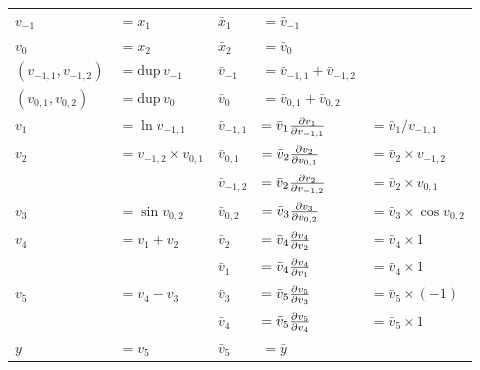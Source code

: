 \documentclass[12pt]{article}
\newcommand{\dup}{\mathrm{dup}}
\begin{document}
\begin{tabular}[t]{ll|lll}

  $v_{-1}$ & $= x_1$
  &
  $\bar{x}_1$ & $= \bar{v}_{-1}$
  \\
  
  $v_{0}$ & $= x_2$
  &
  $\bar{x}_2$ & $= \bar{v}_{0}$
  \\

  \hline

  \((v_{-1,1}, v_{-1,2})\) & \(= \dup \, v_{-1}\)
  &
  \(\bar{v}_{-1}\) & \(= \bar{v}_{-1,1} + \bar{v}_{-1,2}\)
  \\

  \((v_{0,1}, v_{0,2})\) & \(= \dup \, v_0\)
  &
  \(\bar{v}_{0}\) & \(= \bar{v}_{0,1} + \bar{v}_{0,2}\)
  \\

  $v_1$ & $= \ln{v_{-1,1}}$
  &
  \(\bar{v}_{-1,1}\)
  & \(
  = \bar{v}_{1} \frac{\partial v_{1}}{\partial v_{-1,1}}\)
  & \(
  = \bar{v}_1 / v_{-1,1}
  \) \\

  $v_2$ & $= v_{-1,2} \times v_{0,1}$
  &
  \(\bar{v}_{0,1}\)
  & \(
  = \bar{v}_{2} \frac{\partial v_{2}}{\partial v_{0,1}}\)
  & \(
  = \bar{v}_2 \times v_{-1,2}
  \) \\

  & &
  \(\bar{v}_{-1,2}\)
  &
  \(= \bar{v}_{2} \frac{\partial v_{2}}{\partial v_{-1,2}}\)
  & \(
  = \bar{v}_2 \times v_{0,1}
  \) \\

  $v_3$ & $= \sin{v_{0,2}}$
  &
  \(\bar{v}_{0,2}\)
  & \(
  = \bar{v}_{3} \frac{\partial v_{3}}{\partial v_{0,2}}\)
  & \(
  = \bar{v}_3 \times \cos v_{0,2}
  \) \\

  $v_4$ & $= v_1 + v_2$
  &
  \(\bar{v}_2\)
  & \(
  = \bar{v}_{4} \frac{\partial v_{4}}{\partial v_{2}}\)
  & \(
  = \bar{v}_4 \times 1
  \) \\

  & &
  \(\bar{v}_1\)
  &
  \(= \bar{v}_{4} \frac{\partial v_{4}}{\partial v_{1}}\)
  & \(
  = \bar{v}_4 \times 1
  \) \\

  $v_5$ & $= v_4 - v_3$
  &
  \(\bar{v}_3\)
  & \(
  = \bar{v}_{5} \frac{\partial v_{5}}{\partial v_{3}}\)
  & \(
  = \bar{v}_5 \times (-1)
  \) \\
  
  & &
  \(\bar{v}_4\)
  & \(
  = \bar{v}_{5} \frac{\partial v_{5}}{\partial v_{4}}\)
  & \(
  = \bar{v}_5 \times 1
  \) \\
  
  \hline

  $y$ & $= v_5$
  &
  $\bar{v}_5$ & $= \bar{y}$
  \\

\end{tabular}
\end{document}
